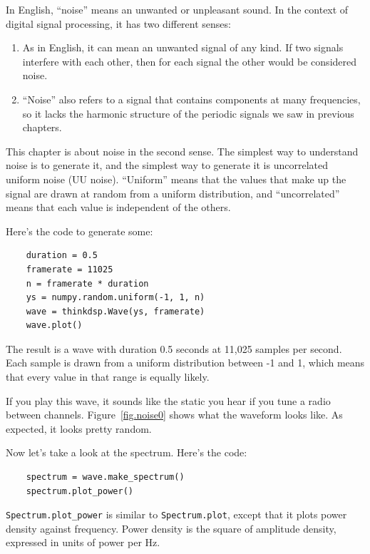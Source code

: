 \documentclass[12pt]{book}
\begin{document}
In English, ``noise'' means an unwanted or unpleasant sound.  In the
context of digital signal processing, it has two different senses:

\begin{enumerate}

\item As in English, it can mean an unwanted signal of any kind.  If
two signals interfere with each other, then for each signal the other
would be considered noise.

\item ``Noise'' also refers to a signal that contains components at
many frequencies, so it lacks the harmonic structure of the periodic
signals we saw in previous chapters.  

\end{enumerate}

This chapter is about noise in the second sense.  The simplest way
to understand noise is to generate it, and the simplest way to generate
it is uncorrelated uniform noise (UU noise).  ``Uniform'' means that the values
that make up the signal are drawn at random from a uniform distribution,
and ``uncorrelated'' means that each value is independent of the others.

Here's the code to generate some:

\begin{verbatim}
    duration = 0.5
    framerate = 11025
    n = framerate * duration
    ys = numpy.random.uniform(-1, 1, n)
    wave = thinkdsp.Wave(ys, framerate)
    wave.plot()
\end{verbatim}

The result is a wave with duration 0.5 seconds at 11,025
samples per second.  Each sample is drawn from a uniform distribution
between -1 and 1, which means that every value in that range is
equally likely.

If you play this wave, it sounds like the static you hear if you tune
a radio between channels.  Figure~\ref{fig.noise0} shows what the
waveform looks like.  As expected, it looks pretty random.

Now let's take a look at the spectrum.  Here's the code:

\begin{verbatim}
    spectrum = wave.make_spectrum()
    spectrum.plot_power()
\end{verbatim}

\verb"Spectrum.plot_power" is similar to \verb"Spectrum.plot",
except that it plots power density against frequency.  Power density
is the square of amplitude density, expressed in units of power per Hz.
\end{document}

